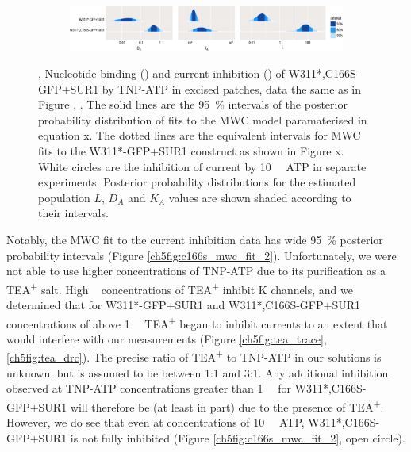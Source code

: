 \begin{figure}[h]
\begin{subfigure}[t]{0.9\textwidth}
		\includegraphics[width=\textwidth]{mwc_c166s_2.pdf}
	\end{subfigure}
	\caption[C166S alters transduction of nucleotide binding to Kir6.2]{
	,  Nucleotide binding () and current inhibition () of W311*,C166S-GFP+SUR1 by TNP-ATP in excised patches, data the same as in Figure , .
	The solid lines are the \SI{95}{\percent} intervals of the posterior probability distribution of fits to the MWC model paramaterised in equation x.
	The dotted lines are the equivalent intervals for MWC fits to the W311*-GFP+SUR1 construct as shown in Figure x.
	White circles are the inhibition of current by \SI{10}{\milli\Molar} ATP in separate experiments.
	 Posterior probability distributions for the estimated population $L$, $D_A$ and $K_A$ values are shown shaded according to their intervals.
	}\label{ch5fig:c166s_3}
\end{figure}

Notably, the MWC fit to the current inhibition data has wide \SI{95}{\percent} posterior probability intervals (Figure \ref{ch5fig:c166s_mwc_fit_2}).
Unfortunately, we were not able to use higher concentrations of TNP-ATP due to its purification as a TEA\textsuperscript{+} salt.
High \si{\milli\Molar} concentrations of TEA\textsuperscript{+} inhibit K\ATP{} channels, and we determined that for W311*-GFP+SUR1 and W311*,C166S-GFP+SUR1 concentrations of above \SI{1}{\milli\Molar} TEA\textsuperscript{+} began to inhibit currents to an extent that would interfere with our measurements (Figure \ref{ch5fig:tea_trace}, \ref{ch5fig:tea_drc}).
The precise ratio of TEA\textsuperscript{+} to TNP-ATP in our solutions is unknown, but is assumed to be between 1:1 and 3:1.
Any additional inhibition observed at TNP-ATP concentrations greater than \SI{1}{\milli\Molar} for W311*,C166S-GFP+SUR1 will therefore be (at least in part) due to the presence of TEA\textsuperscript{+}.
However, we do see that even at concentrations of \SI{10}{\milli\Molar} ATP, W311*,C166S-GFP+SUR1 is not fully inhibited (Figure \ref{ch5fig:c166s_mwc_fit_2}, open circle).


